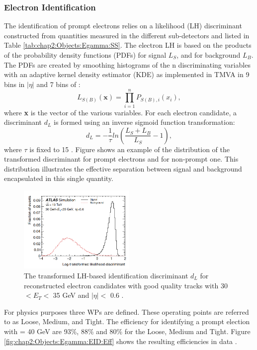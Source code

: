 \subsubsection{Electron Identification}
\label{chap2:Objects:Egamma:EID}
The identification of prompt electrons relies on a likelihood (LH) discriminant constructed from quantities measured in the different sub-detectors and listed in Table \ref{tab:chap2:Objects:Egamma:SS}. The electron LH is based on the products of the probability density functions (PDFs) for signal $L_S$, and for background $L_B$. The PDFs are created by smoothing histograms of the n discriminating variables with an adaptive kernel density estimator (KDE) \cite{KDE} as implemented in TMVA \cite{TMVA} in 9 bins in $|\eta|$ and 7 bins of \eT:
\begin{equation}
    L_{S(B)}(\textbf{x}) = \displaystyle\prod_{i=1}^{n} P_{S(B),i}(x_i),
\end{equation}
where \textbf{x} is the vector of the various variables. For each electron candidate, a discriminant $d_L$ is formed using an inverse sigmoid function transformation:
\begin{equation}
    d_L = -\frac{1}{\tau}ln(\frac{L_S+L_B}{L_S} - 1),
\end{equation}
where $\tau$ is fixed to 15 \cite{TMVA}. Figure shows an example of the distribution of the transformed discriminant for prompt electrons and for non-prompt one. This distribution illustrates the effective separation between signal and background encapsulated in this single quantity.
\begin{figure}[htbp]
    \centering
    \includegraphics[width=0.5\textwidth]{Ch2/Img/Electron_LH.png}
    \caption{The transformed LH-based identification discriminant $d_L$ for reconstructed electron candidates with good quality tracks with 30 $<E_T<$ 35 GeV and $|\eta|<$ 0.6 \cite{Electron_ID_2016}.}
    \label{fig:chap2:Objects:Egamma:EID:LH}
\end{figure}
For physics purposes three WPs are defined. These operating points are referred to as Loose, Medium, and Tight. The efficiency for identifying a prompt election with \eT = 40 GeV are 93\%, 88\% and 80\% for the Loose, Medium and Tight. Figure \ref{fig:chap2:Objects:Egamma:EID:Eff} shows the resulting efficiencies in data \cite{Egamma_Perf_run2}. 
